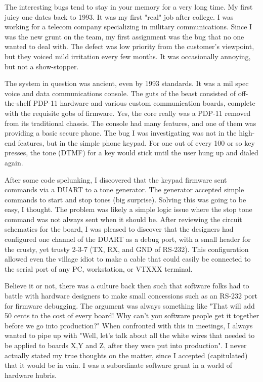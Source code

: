 The interesting bugs tend to stay in your memory for a very long time. My first juicy one dates back to 1993. It was my first "real" job after college. I was working for a telecom company specializing in military communications. Since I was the new grunt on the team, my first assignment was the bug that no one wanted to deal with. The defect was low priority from the customer's viewpoint, but they voiced mild irritation every few months. It was occasionally annoying, but not a show-stopper.

The system in question was ancient, even by 1993 standards. It was a mil spec voice and data communications console. The guts of the beast consisted of off-the-shelf PDP-11 hardware and various custom communication boards, complete with the requisite gobs of firmware. Yes, the core really was a PDP-11 removed from its traditional chassis. The console had many features, and one of them was providing a basic secure phone. The bug I was investigating was not in the high-end features, but in the simple phone keypad. For one out of every 100 or so key presses, the tone (DTMF) for a key would stick until the user hung up and dialed again.

After some code spelunking, I discovered that the keypad firmware sent commands via a DUART to a tone generator. The generator accepted simple commands to start and stop tones (big surprise). Solving this was going to be easy, I thought. The problem was likely a simple logic issue where the stop tone command was not always sent when it should be. After reviewing the circuit schematics for the board, I was pleased to discover that the designers had configured one channel of the DUART as a debug port, with a small header for the crusty, yet trusty 2-3-7 (TX, RX, and GND of RS-232). This configuration allowed even the village idiot to make a cable that could easily be connected to the serial port of any PC, workstation, or VTXXX terminal.

Believe it or not, there was a culture back then such that software folks had to battle with hardware designers to make small concessions such as an RS-232 port for firmware debugging. The argument was always something like "That will add 50 cents to the cost of every board! Why can't you software people get it together before we go into production?" When confronted with this in meetings, I always wanted to pipe up with "Well, let's talk about all the white wires that needed to be applied to boards X,Y and Z, after they were put into production". I never actually stated my true thoughts on the matter, since I accepted (capitulated) that it would be in vain. I was a subordinate software grunt in a world of hardware hubris.

